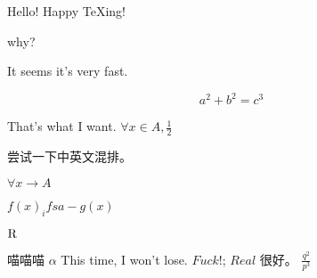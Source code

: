\documentclass[utf8]{ctexart}
\begin{document}
Hello!
Happy \TeX ing!

why?

It seems it's very fast.

\begin{equation}
    a^2+b^2=c^3
\end{equation}


That's what I want.
\(\forall x \in A, \frac{1}{2}\)

尝试一下中英文混排。

\(\forall x \to A\)

\(f(x)_{i}  fsa- g(x)\)

\(\rm{R}\)

喵喵喵
\(\alpha\)
This time, I won't lose. \(Fuck!\);
\( Real\)
很好。
\(\frac{q^{2}}{p^{3}}\)
\end{document}
